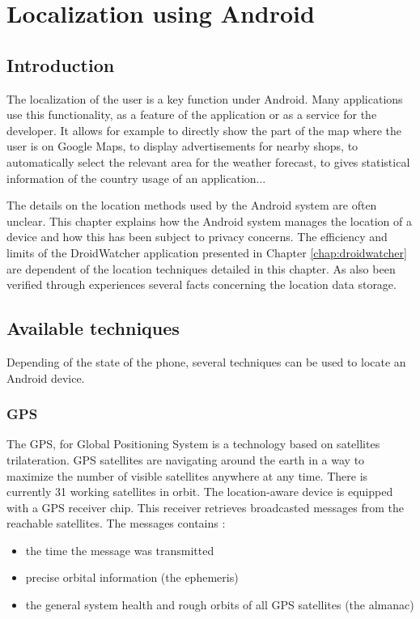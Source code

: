 \chapter{Localization using Android}
\label{chap:and-loc}

\section*{Introduction}
The localization of the user is a key function under Android.
Many applications use this functionality, as a feature of the application or as a service for the developer.
It allows for example to directly show the part of the map where the user is on Google Maps, to display advertisements for nearby shops, to automatically select the relevant area for the weather forecast, to gives statistical information of the country usage of an application...

The details on the location methods used by the Android system are often unclear.
This chapter explains how the Android system manages the location of a device and how this has been subject to privacy concerns.
The efficiency and limits of the DroidWatcher application presented in Chapter \ref{chap:droidwatcher} are dependent of the location techniques detailed in this chapter.
As also been verified through experiences several facts concerning the location data storage.

\section{Available techniques}
Depending of the state of the phone, several techniques can be used to locate an Android device.

\subsection{GPS}
\label{sec:loc-gps}

The GPS, for Global Positioning System is a technology based on satellites trilateration\cite{pocketgpsworld}.
GPS satellites are navigating around the earth in a way to maximize the number of visible satellites anywhere at any time.
There is currently 31 working satellites in orbit.
The location-aware device is equipped with a GPS receiver chip.
This receiver retrieves broadcasted messages from the reachable satellites.
The messages contains :

\begin{itemize}
\item the time the message was transmitted
\item precise orbital information (the ephemeris)
\item the general system health and rough orbits of all GPS satellites (the almanac)
\end{itemize}

